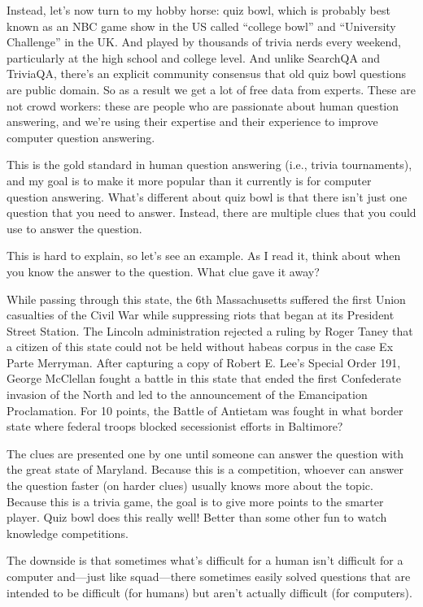 Instead, let's now turn to my hobby horse: quiz bowl, which is probably best known as an NBC game show in the US called “college bowl” and “University Challenge” in the UK.  And played by thousands of trivia nerds every weekend, particularly at the high school and college level.  And unlike SearchQA and TriviaQA, there’s an explicit community consensus that old quiz bowl questions are public domain.  So as a result we get a lot of free data from experts. These are not crowd workers: these are people who are passionate about human question answering, and we're using their expertise and their experience to improve computer question answering.

This is the gold standard in human question answering (i.e., trivia tournaments), and my goal is to make it more popular than it currently is for computer question answering.  What’s different about quiz bowl is that there isn’t just one question that you need to answer.  Instead, there are multiple clues that you could use to answer the question.  

This is hard to explain, so let’s see an example.  As I read it, think about when you know the answer to the question.  What clue gave it away?

While passing through this state, the 6th Massachusetts
suffered the first Union casualties of the Civil War while
suppressing riots that began at its President Street
Station. The Lincoln administration rejected a ruling by
Roger Taney that a citizen of this state could not
be held without habeas corpus in the case Ex Parte
Merryman. After capturing a copy of Robert E. Lee’s
Special Order 191, George McClellan fought a battle in
this state that ended the first Confederate invasion of
the North and led to the announcement of the
Emancipation Proclamation. For 10 points, the Battle of
Antietam was fought in what border state where federal
troops blocked secessionist efforts in Baltimore?



The clues are presented one by one until someone can answer the question with the great state of Maryland. Because this is a competition, whoever can answer the question faster (on harder clues) usually knows more about the topic.  Because this is a trivia game, the goal is to give more points to the smarter player.  Quiz bowl does this really well!  Better than some other fun to watch knowledge competitions.

The downside is that sometimes what's difficult for a human isn't difficult for a computer and—just like squad—there sometimes easily solved questions that are intended to be difficult (for humans) but aren't actually difficult (for computers).  

